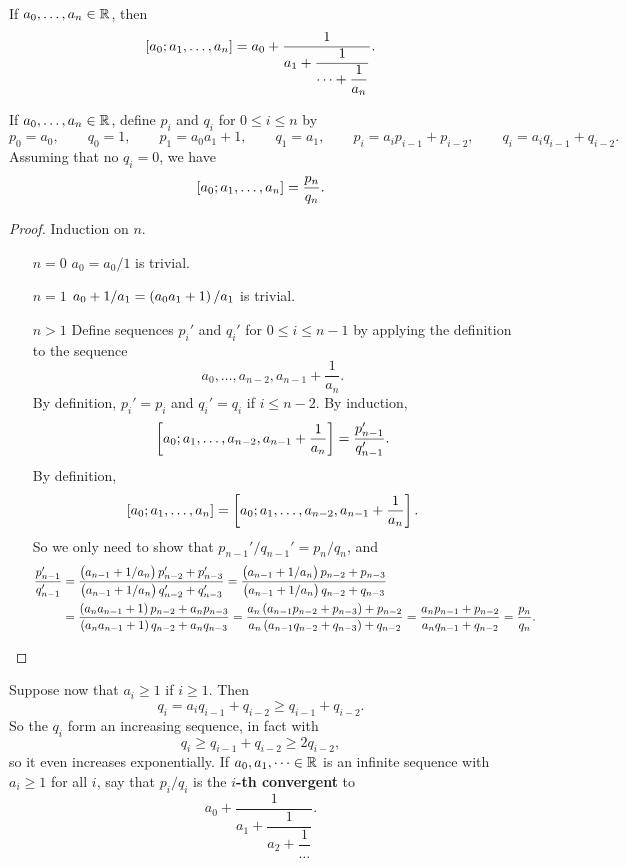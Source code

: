 \pagebreak

If $ a_0, \dots, a_n \in \mathbb{R} $, then
$$ \sbr{a_0; a_1, \dots, a_n} = a_0 + \dfrac{1}{a_1 + \dfrac{1}{\dots + \dfrac{1}{a_n}}}. $$

\begin{lemma}
\label{lem:68}
If $ a_0, \dots, a_n \in \mathbb{R} $, define $ p_i $ and $ q_i $ for $ 0 \le i \le n $ by
$$ p_0 = a_0, \qquad q_0 = 1, \qquad p_1 = a_0a_1 + 1, \qquad q_1 = a_1, \qquad p_i = a_ip_{i - 1} + p_{i - 2}, \qquad q_i = a_iq_{i - 1} + q_{i - 2}. $$
Assuming that no $ q_i = 0 $, we have
$$ \sbr{a_0; a_1, \dots, a_n} = \dfrac{p_n}{q_n}. $$
\end{lemma}

\begin{proof}
Induction on $ n $.
\begin{itemize}[leftmargin=0.5in]
\item[$ n = 0 $] $ a_0 = a_0 / 1 $ is trivial.
\item[$ n = 1 $] $ a_0 + 1 / a_1 = \br{a_0a_1 + 1} / a_1 $ is trivial.
\item[$ n > 1 $] Define sequences $ p_i' $ and $ q_i' $ for $ 0 \le i \le n - 1 $ by applying the definition to the sequence
$$ a_0, \dots, a_{n - 2}, a_{n - 1} + \dfrac{1}{a_n}. $$
By definition, $ p_i' = p_i $ and $ q_i' = q_i $ if $ i \le n - 2 $. By induction,
$$ \sbr{a_0; a_1, \dots, a_{n - 2}, a_{n - 1} + \dfrac{1}{a_n}} = \dfrac{p_{n - 1}'}{q_{n - 1}'}. $$
By definition,
$$ \sbr{a_0; a_1, \dots, a_n} = \sbr{a_0; a_1, \dots, a_{n - 2}, a_{n - 1} + \dfrac{1}{a_n}}. $$
So we only need to show that $ p_{n - 1}' / q_{n - 1}' = p_n / q_n $, and
\begin{align*}
\dfrac{p_{n - 1}'}{q_{n - 1}'}
& = \dfrac{\br{a_{n - 1} + 1 / a_n}p_{n - 2}' + p_{n - 3}'}{\br{a_{n - 1} + 1 / a_n}q_{n - 2}' + q_{n - 3}'}
= \dfrac{\br{a_{n - 1} + 1 / a_n}p_{n - 2} + p_{n - 3}}{\br{a_{n - 1} + 1 / a_n}q_{n - 2} + q_{n - 3}} \\
& = \dfrac{\br{a_na_{n - 1} + 1}p_{n - 2} + a_np_{n - 3}}{\br{a_na_{n - 1} + 1}q_{n - 2} + a_nq_{n - 3}}
= \dfrac{a_n\br{a_{n - 1}p_{n - 2} + p_{n - 3}} + p_{n - 2}}{a_n\br{a_{n - 1}q_{n - 2} + q_{n - 3}} + q_{n - 2}}
= \dfrac{a_np_{n - 1} + p_{n - 2}}{a_nq_{n - 1} + q_{n - 2}}
= \dfrac{p_n}{q_n}.
\end{align*}
\end{itemize}
\end{proof}

Suppose now that $ a_i \ge 1 $ if $ i \ge 1 $. Then
$$ q_i = a_iq_{i - 1} + q_{i - 2} \ge q_{i - 1} + q_{i - 2}. $$
So the $ q_i $ form an increasing sequence, in fact with
$$ q_i \ge q_{i - 1} + q_{i - 2} \ge 2q_{i - 2}, $$
so it even increases exponentially. If $ a_0, a_1, \dots \in \mathbb{R} $ is an infinite sequence with $ a_i \ge 1 $ for all $ i $, say that $ p_i / q_i $ is the \textbf{$ i $-th convergent} to
$$ a_0 + \dfrac{1}{a_1 + \dfrac{1}{a_2 + \dfrac{1}{\dots}}}. $$

